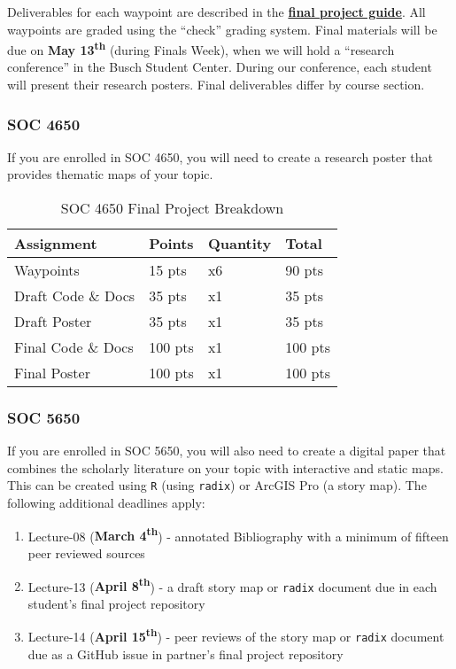 \documentclass[]{book}
\providecommand{\tightlist}{%
  \setlength{\itemsep}{0pt}\setlength{\parskip}{0pt}}
\begin{document}
Deliverables for each waypoint are described in the \href{https://slu-soc5650.github.io/finalGuide}{\textbf{final project guide}}. All waypoints are graded using the ``check'' grading system. Final materials will be due on \textbf{May 13\textsuperscript{th}} (during Finals Week), when we will hold a ``research conference'' in the Busch Student Center. During our conference, each student will present their research posters. Final deliverables differ by course section.

\hypertarget{soc-4650}{%
\subsubsection{SOC 4650}\label{soc-4650}}

If you are enrolled in SOC 4650, you will need to create a research poster that provides thematic maps of your topic.

\begin{table}[t]

\caption{\label{tab:unnamed-chunk-5}SOC 4650 Final Project Breakdown}
\centering
\begin{tabular}{llll}
\toprule
Assignment & Points & Quantity & Total\\
\midrule
Waypoints & 15 pts & x6 & 90 pts\\
Draft Code \& Docs & 35 pts & x1 & 35 pts\\
Draft Poster & 35 pts & x1 & 35 pts\\
Final Code \& Docs & 100 pts & x1 & 100 pts\\
Final Poster & 100 pts & x1 & 100 pts\\
\bottomrule
\end{tabular}
\end{table}

\hypertarget{soc-5650}{%
\subsubsection{SOC 5650}\label{soc-5650}}

If you are enrolled in SOC 5650, you will also need to create a digital paper that combines the scholarly literature on your topic with interactive and static maps. This can be created using \texttt{R} (using \texttt{radix}) or ArcGIS Pro (a story map). The following additional deadlines apply:

\begin{enumerate}
\def\labelenumi{\arabic{enumi}.}
\tightlist
\item
  Lecture-08 (\textbf{March 4\textsuperscript{th}}) - annotated Bibliography with a minimum of fifteen peer reviewed sources
\item
  Lecture-13 (\textbf{April 8\textsuperscript{th}}) - a draft story map or \texttt{radix} document due in each student's final project repository
\item
  Lecture-14 (\textbf{April 15\textsuperscript{th}}) - peer reviews of the story map or \texttt{radix} document due as a GitHub issue in partner's final project repository
\end{enumerate}
\end{document}
